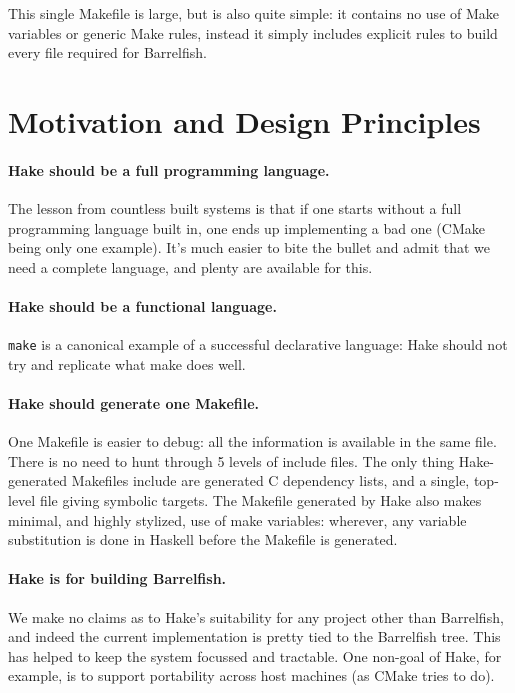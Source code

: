 \documentclass[a4paper,twoside]{report} %
\begin{document}
This single Makefile is large, but is also quite simple: it contains
no use of Make variables or generic Make rules, instead it simply
includes explicit rules to build every file required for Barrelfish. 

\section{Motivation and Design Principles}

\paragraph{Hake should be a full programming language.}  The lesson
from countless built systems is that if one starts without a full
programming language built in, one ends up implementing a bad one
(CMake being only one example).  It's much easier to bite the bullet
and admit that we need a complete language, and plenty are available
for this. 

\paragraph{Hake should be a functional language.}  \texttt{make} is a
canonical example of a successful declarative language: Hake should
not try and replicate what make does well.  

\paragraph{Hake should generate one Makefile.} One Makefile is easier
to debug: all the information is available in the same file.  There is
no need to hunt through 5 levels of include files.  The only thing
Hake-generated Makefiles include are generated C dependency lists, and
a single, top-level file giving symbolic targets.  The Makefile
generated by Hake also makes minimal, and highly stylized, use of make
variables: wherever, any variable substitution is done in Haskell
before the Makefile is generated. 

\paragraph{Hake is for building Barrelfish.}  We make no claims as to
Hake's suitability for any project other than Barrelfish, and indeed
the current implementation is pretty tied to the Barrelfish tree.
This has helped to keep the system focussed and tractable.  One
non-goal of Hake, for example, is to support portability across host
machines (as CMake tries to do). 
\end{document}
